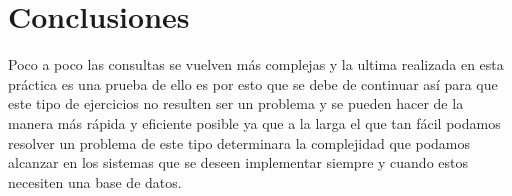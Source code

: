 \documentclass[12pt, titlepage]{article}
\begin{document}
	\section{Conclusiones}
	Poco a poco las consultas se vuelven más complejas y la ultima realizada en esta práctica es una prueba de ello es por esto que se debe de continuar así para que este tipo de ejercicios no resulten ser un problema y se pueden hacer de la manera más rápida y eficiente posible ya que a la larga el que tan fácil podamos resolver un problema de este tipo determinara la complejidad que podamos alcanzar en los sistemas que se deseen implementar siempre y cuando estos necesiten una base de datos.
	 
	
\end{document}
